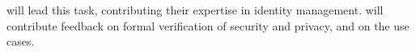 \begin{Workpackage}{\thewpno}
\begin{Task}
\COGNIshort{} will lead this task, contributing their expertise in identity management. \USTANshort{} will contribute feedback on formal verification of security and privacy, \FRQshort{} and \SOPRAshort{} on the use cases.

\end{Task}

\begin{Task}



\end{Task}
\end{Workpackage}
